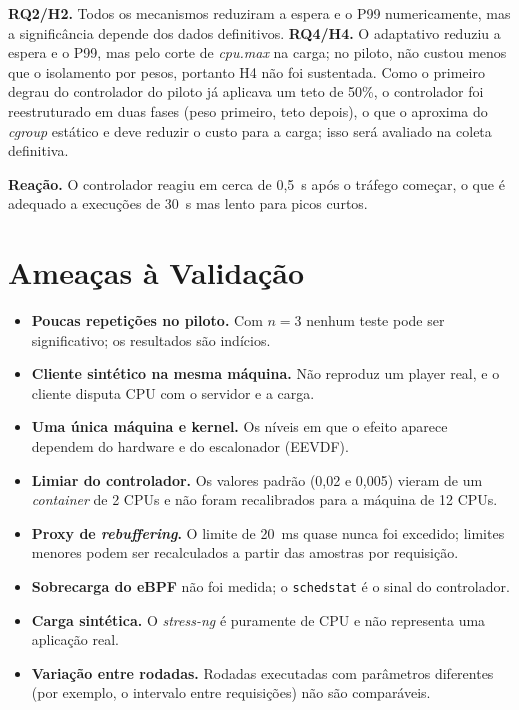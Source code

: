 \documentclass[12pt,a4paper]{article}
\begin{document}
\textbf{RQ2/H2.} Todos os mecanismos reduziram a espera e o P99 numericamente, mas a significância depende dos
dados definitivos. \textbf{RQ4/H4.} O adaptativo reduziu a espera e o P99, mas pelo corte de \textit{cpu.max}
na carga; no piloto, não custou menos que o isolamento por pesos, portanto H4 não foi sustentada. Como o primeiro
degrau do controlador do piloto já aplicava um teto de 50\%, o controlador foi reestruturado em duas fases (peso
primeiro, teto depois), o que o aproxima do \textit{cgroup} estático e deve reduzir o custo para a carga; isso será
avaliado na coleta definitiva.

\textbf{Reação.} O controlador reagiu em cerca de 0,5~s após o tráfego começar, o que é adequado a execuções de
30~s mas lento para picos curtos.

\section{Ameaças à Validação}

\begin{itemize}
    \item \textbf{Poucas repetições no piloto.} Com $n=3$ nenhum teste pode ser significativo; os resultados são
    indícios.
    \item \textbf{Cliente sintético na mesma máquina.} Não reproduz um player real, e o cliente disputa CPU com o
    servidor e a carga.
    \item \textbf{Uma única máquina e kernel.} Os níveis em que o efeito aparece dependem do hardware e do
    escalonador (EEVDF).
    \item \textbf{Limiar do controlador.} Os valores padrão (0,02 e 0,005) vieram de um \textit{container} de 2 CPUs
    e não foram recalibrados para a máquina de 12 CPUs.
    \item \textbf{Proxy de \textit{rebuffering}.} O limite de 20~ms quase nunca foi excedido; limites menores
    podem ser recalculados a partir das amostras por requisição.
    \item \textbf{Sobrecarga do eBPF} não foi medida; o \texttt{schedstat} é o sinal do controlador.
    \item \textbf{Carga sintética.} O \textit{stress-ng} é puramente de CPU e não representa uma aplicação real.
    \item \textbf{Variação entre rodadas.} Rodadas executadas com parâmetros diferentes (por exemplo, o
    intervalo entre requisições) não são comparáveis.
\end{itemize}
\end{document}
